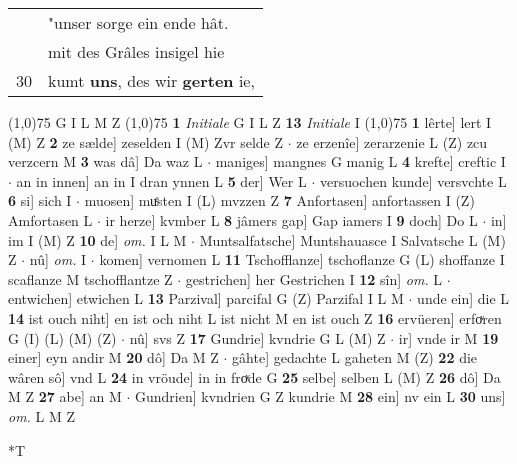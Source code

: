 \documentclass[8pt,a4paper,notitlepage]{article}
\begin{document}
\begin{table}[ht]
\begin{minipage}[t]{0.5\linewidth}
\begin{tabular}{rl}
 & "unser sorge ein ende hât.\\ 
 & mit des Grâles insigel hie\\ 
30 & kumt \textbf{uns}, des wir \textbf{gerten} ie,\\ 
\end{tabular}
\scriptsize
\line(1,0){75} \newline
G I L M Z \newline
\line(1,0){75} \newline
\textbf{1} \textit{Initiale} G I L Z  \textbf{13} \textit{Initiale} I  \newline
\line(1,0){75} \newline
\textbf{1} lêrte] lert I (M) Z \textbf{2} ze sælde] zeselden I (M) Zvr selde Z  $\cdot$ ze erzenîe] zerarzenie L (Z) zcu verzcern M \textbf{3} was dâ] Da waz L  $\cdot$ maniges] mangnes G manig L \textbf{4} krefte] creftic I  $\cdot$ an in innen] an in I dran ynnen L \textbf{5} der] Wer L  $\cdot$ versuochen kunde] versvchte L \textbf{6} si] sich I  $\cdot$ muosen] muͤsten I (L) mvzzen Z \textbf{7} Anfortasen] anfortassen I (Z) Amfortasen L  $\cdot$ ir herze] kvmber L \textbf{8} jâmers gap] Gap iamers I \textbf{9} doch] Do L  $\cdot$ in] im I (M) Z \textbf{10} de] \textit{om.} I L M  $\cdot$ Muntsalfatsche] Muntshauasce I Salvatsche L (M) Z  $\cdot$ nû] \textit{om.} I  $\cdot$ komen] vernomen L \textbf{11} Tschofflanze] tschoflanze G (L) shoffanze I scaflanze M tschofflantze Z  $\cdot$ gestrichen] her Gestrichen I \textbf{12} sîn] \textit{om.} L  $\cdot$ entwichen] etwichen L \textbf{13} Parzival] parcifal G (Z) Parzifal I L M  $\cdot$ unde ein] die L \textbf{14} ist ouch niht] en ist och niht L ist nicht M en ist ouch Z \textbf{16} ervüeren] erfoͮren G (I) (L) (M) (Z)  $\cdot$ nû] svs Z \textbf{17} Gundrie] kvndrie G L (M) Z  $\cdot$ ir] vnde ir M \textbf{19} einer] eyn andir M \textbf{20} dô] Da M Z  $\cdot$ gâhte] gedachte L gaheten M (Z) \textbf{22} die wâren sô] vnd L \textbf{24} in vröude] in in froͮde G \textbf{25} selbe] selben L (M) Z \textbf{26} dô] Da M Z \textbf{27} abe] an M  $\cdot$ Gundrien] kvndrien G Z kundrie M \textbf{28} ein] nv ein L \textbf{30} uns] \textit{om.} L M Z \newline
\end{minipage}
\hspace{0.5cm}
\begin{minipage}[t]{0.5\linewidth}
\small
\begin{center}*T
\end{center}
\begin{tabular}{rl}

\end{tabular}
\end{minipage}
\end{table}
\end{document}
